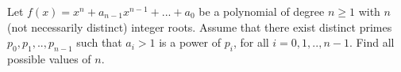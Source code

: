 Let $f(x)=x^n + a_{n-1}x^{n-1} + ...+ a_0 $ be a polynomial of degree $ n\ge 1 $ with $ n$ (not necessarily distinct) integer roots. Assume that there exist distinct primes $p_0,p_1,..,p_{n-1}$ such that $a_i > 1$ is a power of $p_i$,  for all $ i=0,1,..,n-1$. Find all possible values of $ n$.